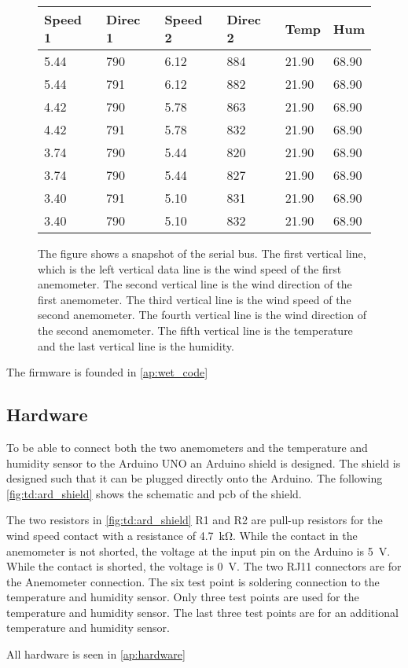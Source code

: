 \begin{figure}[H]
\centering
      \captionsetup{width=0.57\linewidth}
      \footnotesize
\begin{tabular}{llllll}
Speed 1 & Direc 1 & Speed 2 & Direc 2 & Temp  & Hum   \\ \hline
5.44    & 790     & 6.12    & 884     & 21.90 & 68.90 \\
5.44    & 791     & 6.12    & 882     & 21.90 & 68.90 \\
4.42    & 790     & 5.78    & 863     & 21.90 & 68.90 \\
4.42    & 791     & 5.78    & 832     & 21.90 & 68.90 \\
3.74    & 790     & 5.44    & 820     & 21.90 & 68.90 \\
3.74    & 790     & 5.44    & 827     & 21.90 & 68.90 \\
3.40    & 791     & 5.10    & 831     & 21.90 & 68.90 \\
3.40    & 790     & 5.10    & 832     & 21.90 & 68.90
\end{tabular}
\caption{The figure shows a snapshot of the serial bus. The first vertical line, which is the left vertical data line is the wind speed of the first anemometer.  The second vertical line is the wind direction of the first anemometer. The third vertical line is the wind speed of the second anemometer.  The fourth vertical line is the wind direction of the second anemometer. The fifth vertical line is the temperature and the last vertical line is the humidity.}
\label{tp:com_snapshot}
\end{figure}%


The firmware is founded in \autoref{ap:wet_code}


\subsection{Hardware}

To be able to connect both the two anemometers and the temperature and humidity sensor to the Arduino UNO an Arduino shield is designed. The shield is designed such that it can be plugged directly onto the Arduino. The following \autoref{fig:td:ard_shield} shows the schematic and \gls{pcb} of the shield. 




The two resistors in \autoref{fig:td:ard_shield} R1 and R2 are pull-up resistors for the wind speed contact with a resistance of \SI{4.7}{\kilo\ohm}. While the contact in the anemometer is not shorted, the voltage at the input pin on the Arduino is \SI{5}{\volt}. While the contact is shorted, the voltage is \SI{0}{\volt}. The two RJ11 connectors are for the Anemometer connection. The six test point is soldering connection to the temperature and humidity sensor. Only three test points are used for the temperature and humidity sensor. The last three test points are for an additional temperature and humidity sensor.

All hardware is seen in \autoref{ap:hardware}






